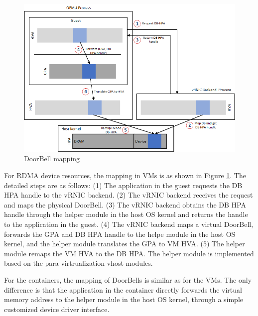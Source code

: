 \begin{figure}[!ht]
	\centering
	\includegraphics[width=1\linewidth]{images/db-map.png}
	\caption{DoorBell mapping}
	\label{fig:db-map}
\end{figure}

For RDMA device resources, the mapping in VMs is as shown in Figure \ref{fig:db-map}. The detailed steps are as follows: (1) The application in the guest requests the DB HPA handle to the vRNIC backend. (2) The vRNIC backend receives the request and maps the physical DoorBell. (3) The vRNIC backend obtains the DB HPA handle through the helper module in the host OS kernel and returns the handle to the application in the guest. (4) The vRNIC backend maps a virtual DoorBell, forwards the GPA and DB HPA handle to the helpe module in the host OS kernel, and the helper module translates the GPA to VM HVA. (5) The helper module remaps the VM HVA to the DB HPA. The helper module is implemented based on the para-virtrualization vhost modules.

For the containers, the mapping of DoorBells is similar as for the VMs. The only difference is that the application in the container directly forwards the virtual memory address to the helper module in the host OS kernel, through a simple customized device driver interface.




